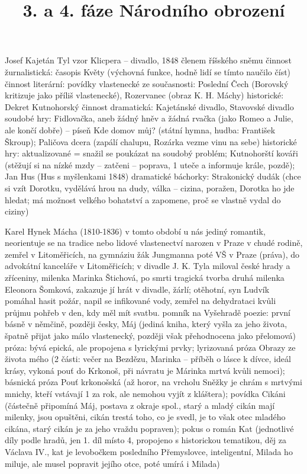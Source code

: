 \documentclass{article}
\title{\vspace{-2cm}3. a 4. fáze Národního obrození\vspace{-1.7cm}}
\date{}
\author{}
\begin{document}
\maketitle



Josef Kajetán Tyl
vzor Klicpera -- divadlo, 1848 členem říšského sněmu
činnost žurnalistická: časopis Květy (výchovná funkce, hodně lidí se tímto naučilo číst)
činnost literární: povídky
vlastenecké ze současnosti: Poslední Čech (Borovský kritizuje jako příliš vlastenecké), Rozervanec (obraz K. H. Máchy)
historické: Dekret Kutnohorský
činnost dramatická: Kajetánské divadlo, Stavovské divadlo
soudobé hry: Fidlovačka, aneb žádný hněv a žádná rvačka (jako Romeo a Julie, ale končí dobře) -- píseň Kde domov můj? (státní hymna, hudba: František Škroup);
Paličova dcera (zapálí chalupu, Rozárka vezme vinu na sebe)
historické hry: aktualizované = snažil se poukázat na soudobý problém; Kutnohorští kováři (stěžují si na nízké mzdy -- zatčeni -- poprava, 1 uteče a informuje krále, pozdě); Jan Hus (Hus s myšlenkami 1848)
dramatické báchorky: Strakonický dudák (chce si vzít Dorotku, vydělává hrou na dudy, válka -- cizina, poražen, Dorotka ho jde hledat; má možnost velkého bohatství a zapomene, proč se vlastně vydal do ciziny)

Karel Hynek Mácha (1810-1836)
v tomto období u nás jediný romantik, neorientuje se na tradice nebo lidové vlastenectví
narozen v Praze v chudé rodině, zemřel v Litoměřicích, na gymnáziu žák Jungmanna
poté VŠ v Praze (práva), do advokátní kanceláře v Litoměřicích; v divadle J. K. Tyla
miloval české hrady a zříceniny, milenka Marinka Štichová, po smrti tragická tvorba
druhá milenka Eleonora Šomková, zakazuje jí hrát v divadle, žárlí; otěhotní, syn Ludvík
pomáhal hasit požár, napil se infikované vody, zemřel na dehydrataci kvůli průjmu
pohřeb v den, kdy měl mít svatbu. pomník na Vyšehradě
poezie: první básně v němčině, později česky, Máj (jediná kniha, který vyšla za jeho života, špatně přijat jako málo vlastenecký, později však přehodnocena jako přelomová)
próza: bývá epická, ale propojena s lyrickými prvky; lyrizovaná próza Obrazy ze života mého (2 části: večer na Bezdězu, Marinka – příběh o lásce k dívce, ideál krásy, vykoná pouť do Krkonoš, při návratu je Márinka mrtvá kvůli nemoci); básnická próza Pouť krkonošská (až horor, na vrcholu Sněžky je chrám s mrtvými mnichy, kteří vstávají 1 za rok, ale nemohou vyjít z kláštera); povídka Cikáni (částečně připomíná Máj, postava z okraje spol., starý a mladý cikán mají milenky, jsou opuštěni, cikán trestá toho, co je svedl, je to však otec mladého cikána, starý cikán je za jeho vraždu popraven); pokus o román Kat (jednotlivé díly podle hradů, jen 1. díl místo 4, propojeno s historickou tematikou, děj za Václava IV., kat je levobočkem posledního Přemyslovce, inteligentní, Milada ho miluje, ale musel popravit jejího otce, poté umírá i Milada)
\end{document}
